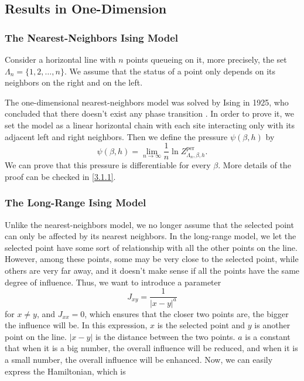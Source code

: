 \documentclass[11pt]{book}
\begin{document}
\subsection{Results in One-Dimension}

\subsubsection{The Nearest-Neighbors Ising Model}

Consider a horizontal line with $n$ points queueing on it, more precisely, the set $\Lambda_n=\{1,2,\ldots,n\}$. We assume that the status of a point only depends on its neighbors on the right and on the left.

The one-dimensional nearest-neighbors model was solved by Ising in 1925, who concluded that there doesn't exist any phase transition \cite{Ising}. In order to prove it, we set the model as a linear horizontal chain with each site interacting only with its adjacent left and right neighbors. Then we define the pressure $\psi(\beta,h)$ by
\begin{equation}\label{pressure_function_1}
\psi(\beta,h) = \lim_{n\to \infty} \frac{1}{n}\ln Z^{\text{per}}_{\Lambda_n,\beta,h}.
\end{equation}
We can prove that this pressure is differentiable for every $\beta$. More details of the proof can be checked in \ref{3.1.1}.

\subsubsection{The Long-Range Ising Model}

Unlike the nearest-neighbors model, we no longer assume that the selected point can only be affected by its nearest neighbors. In the long-range model, we let the selected point have some sort of relationship with all the other points on the line. However, among these points, some may be very close to the selected point, while others are very far away, and it doesn't make sense if all the points have the same degree of influence. Thus, we want to introduce a parameter 
\[
J_{xy} = \frac{1}{\left| x - y \right|^a}
\]
for $x\neq y$, and $J_{xx}=0$, which ensures that the closer two points are, the bigger the influence will be. In this expression, $x$ is the selected point and $y$ is another point on the line. $\left| x - y \right|$ is the distance between the two points. $a$ is a constant that when it is a big number, the overall influence will be reduced, and when it is a small number, the overall influence will be enhanced. Now, we can easily express the Hamiltonian, which is 
\end{document}
